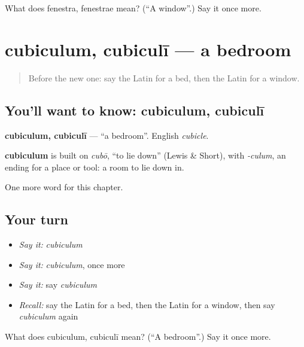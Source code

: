 \begin{tcolorbox}[breakable,colback=teal!4,colframe=teal!35!black,title={Before you move on}]
What does fenestra, fenestrae mean? (\textquotedblleft{}A window\textquotedblright{}.) Say it once more.
\end{tcolorbox}
\section[cubiculum, cubiculī]{cubiculum, cubiculī — a bedroom}

\label{lesson:LA-C82-cubiculum}



\begin{quote}
Before the new one: say the Latin for a bed, then the Latin for a window.
\end{quote}

\subsection*{You'll want to know: cubiculum, cubiculī}
\textbf{cubiculum, cubiculī} — \textquotedblleft{}a bedroom\textquotedblright{}. English \emph{cubicle}.

\begin{cousinweb}
\textbf{cubiculum} is built on \emph{cubō}, \textquotedblleft{}to lie down\textquotedblright{} (Lewis \& Short), with \emph{-culum}, an ending for a place or tool: a room to lie down in.
\end{cousinweb}

\begin{grammarlens}[title={What you've built}]
One more word for this chapter.
\end{grammarlens}

\subsection*{Your turn}
\begin{itemize}
\raggedright
  \item \emph{Say it:} \emph{cubiculum}
  \item \emph{Say it:} \emph{cubiculum}, once more
  \item \emph{Say it:} say \emph{cubiculum}
  \item \emph{Recall:} say the Latin for a bed, then the Latin for a window, then say \emph{cubiculum} again
\end{itemize}

\begin{tcolorbox}[breakable,colback=teal!4,colframe=teal!35!black,title={Before you move on}]
What does cubiculum, cubiculī mean? (\textquotedblleft{}A bedroom\textquotedblright{}.) Say it once more.
\end{tcolorbox}

